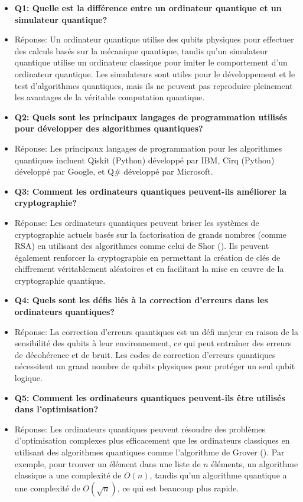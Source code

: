\documentclass{article}
\begin{document}
\begin{itemize}
  \item \textbf{Q1: Quelle est la différence entre un ordinateur quantique et un simulateur quantique?}
  \item Réponse: Un ordinateur quantique utilise des qubits physiques pour effectuer des calculs basés sur la mécanique quantique, tandis qu'un simulateur quantique utilise un ordinateur classique pour imiter le comportement d'un ordinateur quantique. Les simulateurs sont utiles pour le développement et le test d'algorithmes quantiques, mais ils ne peuvent pas reproduire pleinement les avantages de la véritable computation quantique.

  \item \textbf{Q2: Quels sont les principaux langages de programmation utilisés pour développer des algorithmes quantiques?}
  \item Réponse: Les principaux langages de programmation pour les algorithmes quantiques incluent Qiskit (Python) développé par IBM, Cirq (Python) développé par Google, et Q\# développé par Microsoft.

  \item \textbf{Q3: Comment les ordinateurs quantiques peuvent-ils améliorer la cryptographie?}
  \item Réponse: Les ordinateurs quantiques peuvent briser les systèmes de cryptographie actuels basés sur la factorisation de grands nombres (comme RSA) en utilisant des algorithmes comme celui de Shor (\cite{wikipediaAlgorithmeShor}). Ils peuvent également renforcer la cryptographie en permettant la création de clés de chiffrement véritablement aléatoires et en facilitant la mise en œuvre de la cryptographie quantique.

  \item \textbf{Q4: Quels sont les défis liés à la correction d'erreurs dans les ordinateurs quantiques?}
  \item Réponse: La correction d'erreurs quantiques est un défi majeur en raison de la sensibilité des qubits à leur environnement, ce qui peut entraîner des erreurs de décohérence et de bruit. Les codes de correction d'erreurs quantiques nécessitent un grand nombre de qubits physiques pour protéger un seul qubit logique.

  \item \textbf{Q5: Comment les ordinateurs quantiques peuvent-ils être utilisés dans l'optimisation?}
  \item Réponse: Les ordinateurs quantiques peuvent résoudre des problèmes d'optimisation complexes plus efficacement que les ordinateurs classiques en utilisant des algorithmes quantiques comme l'algorithme de Grover (\cite{wikipediaAlgorithmeGrover}). Par exemple, pour trouver un élément dans une liste de $n$ éléments, un algorithme classique a une complexité de $O(n)$, tandis qu'un algorithme quantique a une complexité de $O(\sqrt{n})$, ce qui est beaucoup plus rapide.
  

\end{itemize}
\end{document}
